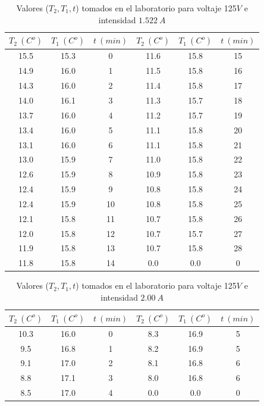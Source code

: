 \documentclass[12pt,a4paper]{article}
\begin{document}
\begin{table}[h!] 	 \centering 
\begin{tabular}{|c|c|c||c|c|c|} 
\hline 
$T_2 \ (C^o)$ & $T_1 \ (C^o) $ & $t \ (min)$ & $T_2 \ (C^o)$ & $T_1 \ (C^o) $ & $t \ (min)$ \\ \hline 
15.5 &  15.3 & 0 & 11.6 & 15.8 & 15 \\ 
14.9 &  16.0 & 1 & 11.5 & 15.8 & 16 \\ 
14.3 &  16.0 & 2 & 11.4 & 15.8 & 17 \\ 
14.0 &  16.1 & 3 & 11.3 & 15.7 & 18 \\ 
13.7 &  16.0 & 4 & 11.2 & 15.7 & 19 \\ 
13.4 &  16.0 & 5 & 11.1 & 15.8 & 20 \\ 
13.1 &  16.0 & 6 & 11.1 & 15.8 & 21 \\ 
13.0 &  15.9 & 7 & 11.0 & 15.8 & 22 \\ 
12.6 &  15.9 & 8 & 10.9 & 15.8 & 23 \\ 
12.4 &  15.9 & 9 & 10.8 & 15.8 & 24 \\ 
12.4 &  15.9 & 10 & 10.8 & 15.8 & 25 \\ 
12.1 &  15.8 & 11 & 10.7 & 15.8 & 26 \\ 
12.0 &  15.8 & 12 & 10.7 & 15.7 & 27 \\ 
11.9 &  15.8 & 13 & 10.7 & 15.8 & 28 \\ 
11.8 &  15.8 & 14 & 0.0 & 0.0 & 0 \\ 
\hline 
\end{tabular} 
\caption{Valores ($T_2,T_1,t$) tomados en el laboratorio para voltaje 125$V$ e intensidad $1.522 \ A$} 
\label{tab:} 
\end{table} 


\newpage


\begin{table}[h!] 	 \centering 
\begin{tabular}{|c|c|c||c|c|c|} 
\hline 
$T_2 \ (C^o)$ & $T_1 \ (C^o) $ & $t \ (min)$ & $T_2 \ (C^o)$ & $T_1 \ (C^o) $ & $t \ (min)$ \\ \hline 
10.3 &  16.0 & 0 & 8.3 & 16.9 & 5 \\ 
9.5 &  16.8 & 1 & 8.2 & 16.9 & 5 \\ 
9.1 &  17.0 & 2 & 8.1 & 16.8 & 6 \\ 
8.8 &  17.1 & 3 & 8.0 & 16.8 & 6 \\ 
8.5 &  17.0 & 4 & 0.0 & 0.0 & 0 \\ 
\hline 
\end{tabular} 
\caption{Valores ($T_2,T_1,t$) tomados en el laboratorio para voltaje 125$V$ e intensidad $2.00 \ A$} 
\label{tab:} 
\end{table} 
\end{document}
